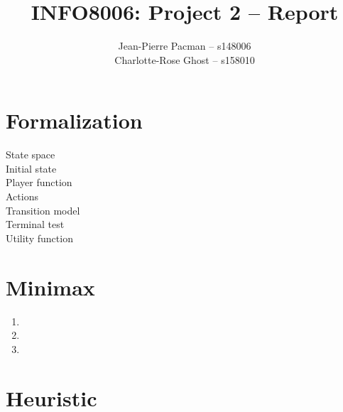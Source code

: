 \documentclass{article}
\title{\Large{INFO8006: Project 2 -- Report}}
\author{Jean-Pierre Pacman -- s148006\\Charlotte-Rose Ghost -- s158010}
\begin{document}
\maketitle

\section{Formalization}

\begin{description}
    \item[State space]
    \item[Initial state]
    \item[Player function]
    \item[Actions]
    \item[Transition model]
    \item[Terminal test]
    \item[Utility function]
\end{description}

\section{Minimax}

\begin{enumerate}[leftmargin=*, label=\alph*.]
    \item
    \item
    \item
\end{enumerate}

\section{Heuristic}
\end{document}
